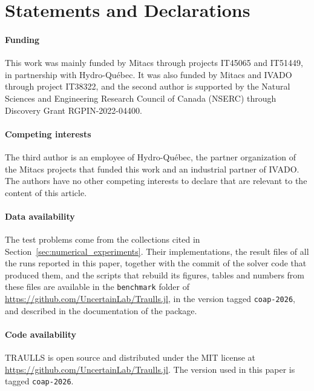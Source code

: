 \documentclass{article}
\numberwithin{equation}{section}
\theoremstyle{plain}
\begin{document}
\section*{Statements and Declarations}

\paragraph*{Funding} This work was mainly funded by Mitacs through projects IT45065 and IT51449, in partnership with Hydro-Qu\'ebec. It was also funded by Mitacs and IVADO through project IT38322, and the second author is supported by the Natural Sciences and Engineering Research Council of Canada (NSERC) through Discovery Grant RGPIN-2022-04400.

\paragraph*{Competing interests} The third author is an employee of Hydro-Qu\'ebec, the partner organization of the Mitacs projects that funded this work and an industrial partner of IVADO. The authors have no other competing interests to declare that are relevant to the content of this article.

\paragraph*{Data availability} The test problems come from the collections cited in Section~\ref{sec:numerical_experiments}. Their implementations, the result files of all the runs reported in this paper, together with the commit of the solver code that produced them, and the scripts that rebuild its figures, tables and numbers from these files are available in the \texttt{benchmark} folder of \url{https://github.com/UncertainLab/Traulls.jl}, in the version tagged \texttt{coap-2026}, and described in the documentation of the package.

\paragraph*{Code availability} TRAULLS is open source and distributed under the MIT license at \url{https://github.com/UncertainLab/Traulls.jl}. The version used in this paper is tagged \texttt{coap-2026}.

	
	
	
	\clearpage
	
\end{document}
